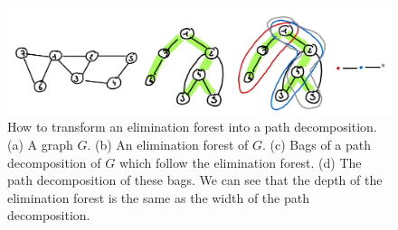 \begin{figure}
    \includegraphics[width=\textwidth]{figures/treedepth-to-pathwidth.png}
    \caption{How to transform an elimination forest into a path decomposition. (a) A graph $G$. (b) An elimination forest of $G$. (c) Bags of a path decomposition of $G$ which follow the elimination forest. (d) The path decomposition of these bags. We can see that the depth of the elimination forest is the same as the width of the path decomposition.}
    \label{fig:treedepth-to-pathwidth}
\end{figure}